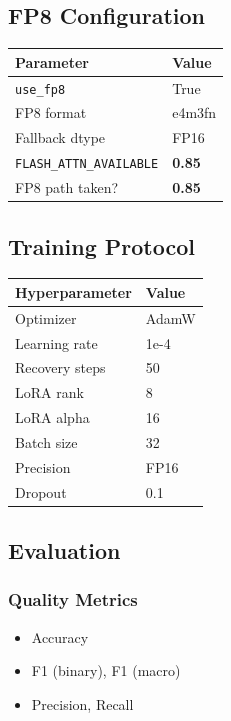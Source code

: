 \subsection{FP8 Configuration}

\begin{table}[H]
\centering
\small
\begin{tabular}{ll}
\toprule
\textbf{Parameter} & \textbf{Value} \\
\midrule
\texttt{use\_fp8} & True \\
FP8 format & e4m3fn \\
Fallback dtype & FP16 \\
\texttt{FLASH\_ATTN\_AVAILABLE} & \textbf{0.85} \\
FP8 path taken? & \textbf{0.85} \\
\bottomrule
\end{tabular}
\end{table}

\subsection{Training Protocol}

\begin{table}[H]
\centering
\small
\begin{tabular}{ll}
\toprule
\textbf{Hyperparameter} & \textbf{Value} \\
\midrule
Optimizer & AdamW \\
Learning rate & 1e-4 \\
Recovery steps & 50 \\
LoRA rank & 8 \\
LoRA alpha & 16 \\
Batch size & 32 \\
Precision & FP16 \\
Dropout & 0.1 \\
\bottomrule
\end{tabular}
\end{table}

\subsection{Evaluation}

\subsubsection{Quality Metrics}

\begin{itemize}
\item Accuracy
\item F1 (binary), F1 (macro)
\item Precision, Recall

\end{itemize}
